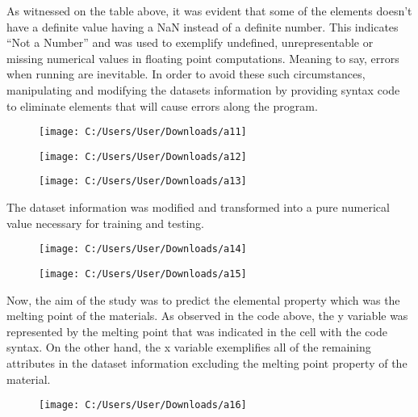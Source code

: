 \documentclass[12pt]{article}
\begin{document}
As witnessed on the table above, it was evident that some of the elements doesn’t have a definite value having a NaN instead of a definite number. This indicates “Not a Number” and was used to exemplify undefined, unrepresentable or missing numerical values in floating point computations. Meaning to say, errors when running are inevitable. In order to avoid these such circumstances, manipulating and modifying the datasets information by providing syntax code to eliminate elements that will cause errors along the program.\\
\vspace{-10mm}
\begin{figure}[h!]
	\centering
	\texttt{[image: C:/Users/User/Downloads/a11]}
\end{figure}
\vspace{-10mm}
\begin{figure}[h!]
	\centering
	\texttt{[image: C:/Users/User/Downloads/a12]}
\end{figure}
\vspace{-10mm}
\begin{figure}[h!]
	\centering
	\texttt{[image: C:/Users/User/Downloads/a13]}
\end{figure}
\vspace{-6mm}

The dataset information was modified and transformed into a pure numerical value necessary for training and testing.\\

\newpage
\begin{figure}[h!]
	\centering
	\texttt{[image: C:/Users/User/Downloads/a14]}
\end{figure}
\vspace{-10mm}
\begin{figure}[h!]
	\centering
	\texttt{[image: C:/Users/User/Downloads/a15]}
\end{figure}
\vspace{-8mm}

Now, the aim of the study was to predict the elemental property which was the melting point of the materials. As observed in the code above, the y variable was represented by the melting point that was indicated in the cell with the code syntax. On the other hand, the x variable exemplifies all of the remaining attributes in the dataset information excluding the melting point property of the material.\\
\vspace{-10mm}
\begin{figure}[h!]
	\centering
	\texttt{[image: C:/Users/User/Downloads/a16]}
\end{figure}
\vspace{-6mm}
\end{document}
